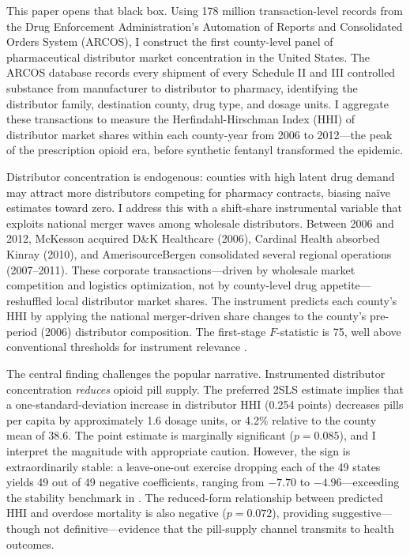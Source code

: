 \documentclass[12pt]{article}
\begin{document}
This paper opens that black box. Using 178 million transaction-level records from the Drug Enforcement Administration's Automation of Reports and Consolidated Orders System (ARCOS), I construct the first county-level panel of pharmaceutical distributor market concentration in the United States. The ARCOS database records every shipment of every Schedule II and III controlled substance from manufacturer to distributor to pharmacy, identifying the distributor family, destination county, drug type, and dosage units. I aggregate these transactions to measure the Herfindahl-Hirschman Index (HHI) of distributor market shares within each county-year from 2006 to 2012---the peak of the prescription opioid era, before synthetic fentanyl transformed the epidemic.

Distributor concentration is endogenous: counties with high latent drug demand may attract more distributors competing for pharmacy contracts, biasing na\"ive estimates toward zero. I address this with a shift-share instrumental variable that exploits national merger waves among wholesale distributors. Between 2006 and 2012, McKesson acquired D\&K Healthcare (2006), Cardinal Health absorbed Kinray (2010), and AmerisourceBergen consolidated several regional operations (2007--2011). These corporate transactions---driven by wholesale market competition and logistics optimization, not by county-level drug appetite---reshuffled local distributor market shares. The instrument predicts each county's HHI by applying the national merger-driven share changes to the county's pre-period (2006) distributor composition. The first-stage $F$-statistic is 75, well above conventional thresholds for instrument relevance \citep{montiel2013effective, keane2024practical}.

The central finding challenges the popular narrative. Instrumented distributor concentration \emph{reduces} opioid pill supply. The preferred 2SLS estimate implies that a one-standard-deviation increase in distributor HHI (0.254 points) decreases pills per capita by approximately 1.6 dosage units, or 4.2\% relative to the county mean of 38.6. The point estimate is marginally significant ($p = 0.085$), and I interpret the magnitude with appropriate caution. However, the sign is extraordinarily stable: a leave-one-out exercise dropping each of the 49 states yields 49 out of 49 negative coefficients, ranging from $-7.70$ to $-4.96$---exceeding the stability benchmark in \citet{young2022consistency}. The reduced-form relationship between predicted HHI and overdose mortality is also negative ($p = 0.072$), providing suggestive---though not definitive---evidence that the pill-supply channel transmits to health outcomes.
\end{document}
